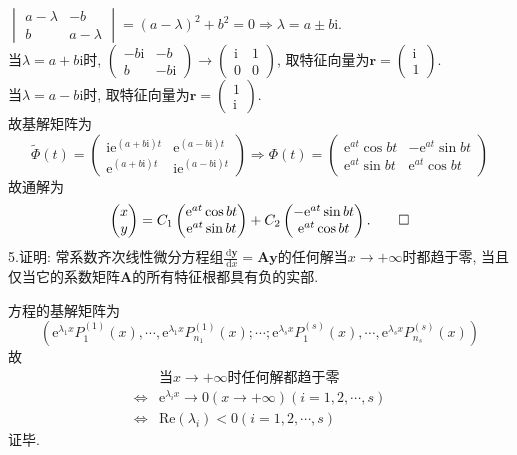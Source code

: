 \documentclass[titlepage,11pt,a4paper,twoside]{report}
\makeatletter
\newcommand\diff{\,\mathrm{d}}
\newcommand\e{\mathrm{e}}
\newcommand\ii{\mathrm{i}}
\newcommand\bmitPhi{\bm{\varPhi}}
\renewenvironment{proof}{\par
	\pushQED{\qed}%
	\normalfont \topsep1\p@\@plus6\p@\relax
	\trivlist
	\item\relax
	{\hspace*{\parindent}{\heiti 证明}\@addpunct{:}}\hspace\labelsep\ignorespaces
}{%
	\popQED\endtrivlist\@endpefalse
}
\newenvironment{solve}{\par
	\pushQED{\qed}%
	\normalfont \topsep1\p@\@plus6\p@\relax
	\trivlist
	\item\relax
	{\hspace*{\parindent}{\heiti 解}\@addpunct{:}}\hspace\labelsep\ignorespaces
}{%
	\popQED\endtrivlist\@endpefalse
}
\makeatother
\begin{document}
\begin{solve}
$\begin{vmatrix}a-\lambda&-b\\b&a-\lambda\end{vmatrix}=(a-\lambda)^2+b^2=0\Rightarrow\lambda=a\pm b\ii$.\\
当$\lambda=a+b\ii$时, $\begin{pmatrix}-b\ii&-b\\b&-b\ii\end{pmatrix}\to\begin{pmatrix}\ii&1\\0&0\end{pmatrix}$, 取特征向量为$\bm{r}=\begin{pmatrix}\ii\\1\end{pmatrix}$.\\
当$\lambda=a-b\ii$时, 取特征向量为$\bm{r}=\begin{pmatrix}1\\\ii\end{pmatrix}$.\\
故基解矩阵为
\[\widetilde{\bmitPhi}(t)=\begin{pmatrix}\ii\e^{(a+b\ii)t}&\e^{(a-b\ii)t}\\\e^{(a+b\ii)t}&\ii\e^{(a-b\ii)t}\end{pmatrix}\Rightarrow\bmitPhi(t)=\begin{pmatrix}\e^{at}\cos bt&-\e^{at}\sin bt\\ \e^{at}\sin bt&\e^{at}\cos bt\end{pmatrix}\]
故通解为
\[\begin{pmatrix}x\\y\end{pmatrix}=C_1\begin{pmatrix}\e^{at}\cos bt\\\e^{at}\sin bt\end{pmatrix}+C_2\begin{pmatrix}-\e^{at}\sin bt\\\e^{at}\cos bt\end{pmatrix}.\qedhere\]
\end{solve}
5.证明: 常系数齐次线性微分方程组$\displaystyle\frac{\diff\bm{y}}{\diff x}=\bm{A}\bm{y}$的任何解当$x\to+\infty$时都趋于零, 当且仅当它的系数矩阵$\bm{A}$的所有特征根都具有负的实部.
\begin{proof}方程的基解矩阵为
\[\left(\e^{\lambda_1x}P_1^{(1)}(x),\cdots,\e^{\lambda_1x}P_{n_1}^{(1)}(x);\cdots;\e^{\lambda_sx}P_1^{(s)}(x),\cdots,\e^{\lambda_sx}P_{n_s}^{(s)}(x)\right)\]
故
\[\begin{split}
&\mbox{当}x\to+\infty\mbox{时任何解都趋于零}\\
\iff&\e^{\lambda_ix}\to0(x\to+\infty)(i=1,2,\cdots,s)\\
\iff&\mathrm{Re}(\lambda_i)<0(i=1,2,\cdots,s)
\end{split}\]
证毕.
\end{proof}
\end{document}
